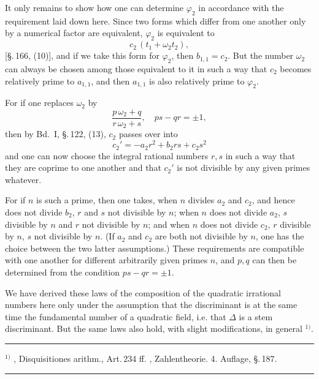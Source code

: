 
It only remains to show how one can determine $\varphi_2$ in accordance with the requirement laid down here. Since two forms which differ from one another only by a numerical factor are equivalent, $\varphi_2$ is equivalent to
\[
c_2\, (t_1 + \omega_2 t_2),
\]
[\S.\,166, (10)], and if we take this form for $\varphi_2$, then $b_{1,1} = c_2$. But the number $\omega_2$ can always be chosen among those equivalent to it in such a way that $c_2$ becomes relatively prime to $a_{1,1}$, and then $a_{1,1}$ is also relatively prime to $\varphi_2$.

For if one replaces $\omega_2$ by
\[
\frac{p\, \omega_2 + q}{r\, \omega_2 + s}, \quad p s - q r = \pm 1,
\]
then by Bd.\ I, \S.\,122, (13), $c_2$ passes over into
\[
c_2' = -a_2 r^2 + b_2 r s + c_2 s^2
\]
and one can now choose the integral rational numbers $r, s$ in such a way that they are coprime to one another and that $c_2'$ is not divisible by any given primes whatever.

For if $n$ is such a prime, then one takes, when $n$ divides $a_2$ and $c_2$, and hence does not divide $b_2$, $r$ and $s$ not divisible by $n$; when $n$ does not divide $a_2$, $s$ divisible by $n$ and $r$ not divisible by $n$; and when $n$ does not divide $c_2$, $r$ divisible by $n$, $s$ not divisible by $n$. (If $a_2$ and $c_2$ are both not divisible by $n$, one has the choice between the two latter assumptions.) These requirements are compatible with one another for different arbitrarily given primes $n$, and $p, q$ can then be determined from the condition $p s - q r = \pm 1$.

We have derived these laws of the composition of the quadratic irrational numbers here only under the assumption that the discriminant is at the same time the fundamental number of a quadratic field, i.e. that $\Delta$ is a stem discriminant. But the same laws also hold, with slight modifications, in general $^{1)}$.

\noindent\rule{4cm}{0.4pt}

$^{1)}$ , Disquisitiones arithm., Art.\,234 ff. , Zahlentheorie. 4. Auflage, \S.\,187.

\begin{center}
\rule{0.2\linewidth}{0.4pt}
\end{center}

